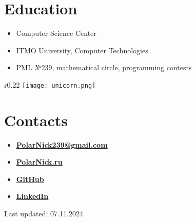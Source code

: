 \documentclass[11pt,oneside]{article}
\newcommand{\hhref}[2]{\href{#1}{\color{blue}#2}}
\begin{document}
\vspace{-9pt}
\section*{\textbf{Education}}
\vspace{-9pt}

\begin{itemize}
    \item{Computer Science Center}
    \item{ITMO University, Computer Technologies}
    \item{PML №239, mathematical circle, programming contests}
\end{itemize}

\begin{wrapfigure}{r}{0.22\textwidth}
    \centering
    \texttt{[image: unicorn.png]}
\end{wrapfigure}

\vspace{-9pt}
\section*{\textbf{Contacts}}
\vspace{-9pt}

\begin{itemize}

    \item{\textbf{\hhref{mailto:PolarNick239@gmail.com}{PolarNick239@gmail.com}}}

    \item{\textbf{\hhref{http://polarnick239.github.io/index_ru.html}{PolarNick.ru}}}

    \item{\textbf{\hhref{https://github.com/PolarNick239}{GitHub}}}

    \item{\textbf{\hhref{https://www.linkedin.com/in/nikolai-poliarnyi-61393b7b}{LinkedIn}}}

\end{itemize}

Last updated: 07.11.2024
\end{document}
